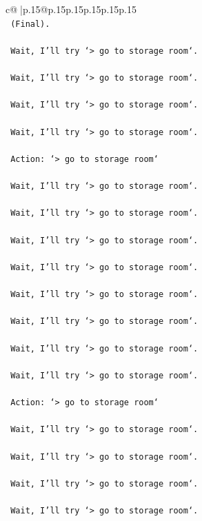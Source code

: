 \documentclass{article}
\begin{document}
{\begin{supertabular}{c@{$\;$}|p{.15\linewidth}@{}p{.15\linewidth}p{.15\linewidth}p{.15\linewidth}p{.15\linewidth}p{.15\linewidth}}
{{{\\ 
\texttt{    (Final).} \\
\\ 
\texttt{    Wait, I'll try `> go to storage room`.} \\
\\ 
\texttt{    Wait, I'll try `> go to storage room`.} \\
\\ 
\texttt{    Wait, I'll try `> go to storage room`.} \\
\\ 
\texttt{    Wait, I'll try `> go to storage room`.} \\
\\ 
\texttt{    Action: `> go to storage room`} \\
\\ 
\texttt{    Wait, I'll try `> go to storage room`.} \\
\\ 
\texttt{    Wait, I'll try `> go to storage room`.} \\
\\ 
\texttt{    Wait, I'll try `> go to storage room`.} \\
\\ 
\texttt{    Wait, I'll try `> go to storage room`.} \\
\\ 
\texttt{    Wait, I'll try `> go to storage room`.} \\
\\ 
\texttt{    Wait, I'll try `> go to storage room`.} \\
\\ 
\texttt{    Wait, I'll try `> go to storage room`.} \\
\\ 
\texttt{    Wait, I'll try `> go to storage room`.} \\
\\ 
\texttt{    Action: `> go to storage room`} \\
\\ 
\texttt{    Wait, I'll try `> go to storage room`.} \\
\\ 
\texttt{    Wait, I'll try `> go to storage room`.} \\
\\ 
\texttt{    Wait, I'll try `> go to storage room`.} \\
\\ 
\texttt{    Wait, I'll try `> go to storage room`.} \\
\\ 
}}}
\end{supertabular}}
\end{document}
